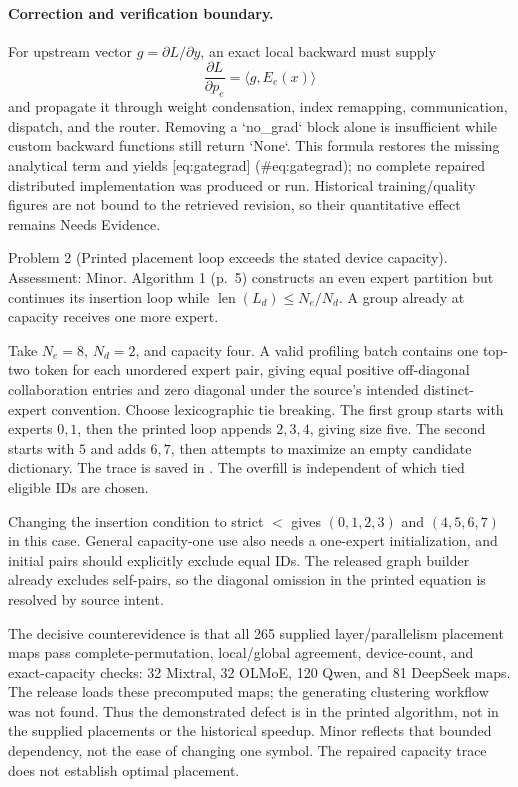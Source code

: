 \documentclass[10pt]{article}
\begin{document}
\paragraph*{Correction and verification boundary.}\mbox{}\par
For upstream vector \(g=\partial L/\partial y\), an exact local backward must supply \[\frac{\partial L}{\partial p_e}=\langle g,E_e(x)\rangle\] and propagate it through weight condensation, index remapping, communication, dispatch, and the router. Removing a `no\_grad` block alone is insufficient while custom backward functions still return `None`. This formula restores the missing analytical term and yields [eq:gategrad] (\#eq:gategrad); no complete repaired distributed implementation was produced or run. Historical training/quality figures are not bound to the retrieved revision, so their quantitative effect remains Needs Evidence.\par
Problem 2 (Printed placement loop exceeds the stated device capacity).  Assessment: Minor. Algorithm 1 (p. 5) constructs an even expert partition but continues its insertion loop while \(\operatorname{len}(L_d)\le N_e/N_d\). A group already at capacity receives one more expert.\par
Take \(N_e=8\), \(N_d=2\), and capacity four. A valid profiling batch contains one top-two token for each unordered expert pair, giving equal positive off-diagonal collaboration entries and zero diagonal under the source’s intended distinct-expert convention. Choose lexicographic tie breaking. The first group starts with experts \(0,1\), then the printed loop appends \(2,3,4\), giving size five. The second starts with \(5\) and adds \(6,7\), then attempts to maximize an empty candidate dictionary. The trace is saved in . The overfill is independent of which tied eligible IDs are chosen.\par
Changing the insertion condition to strict \(<\) gives \((0,1,2,3)\) and \((4,5,6,7)\) in this case. General capacity-one use also needs a one-expert initialization, and initial pairs should explicitly exclude equal IDs. The released graph builder already excludes self-pairs, so the diagonal omission in the printed equation is resolved by source intent.\par
The decisive counterevidence is that all 265 supplied layer/parallelism placement maps pass complete-permutation, local/global agreement, device-count, and exact-capacity checks: 32 Mixtral, 32 OLMoE, 120 Qwen, and 81 DeepSeek maps. The release loads these precomputed maps; the generating clustering workflow was not found. Thus the demonstrated defect is in the printed algorithm, not in the supplied placements or the historical speedup. Minor reflects that bounded dependency, not the ease of changing one symbol. The repaired capacity trace does not establish optimal placement.\par
\end{document}
